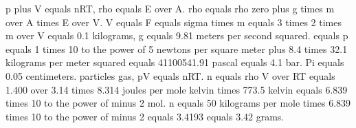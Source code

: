 p plus V equals nRT, rho equals E over A.  
rho equals rho zero plus g times m over A times E over V.  
V equals F equals sigma times m equals 3 times 2 times m over V equals 0.1 kilograms, g equals 9.81 meters per second squared.  
equals p equals 1 times 10 to the power of 5 newtons per square meter plus 8.4 times 32.1 kilograms per meter squared equals 41100541.91 pascal equals 4.1 bar.  
Pi equals 0.05 centimeters.  
particles gas, pV equals nRT.  
n equals rho V over RT equals 1.400 over 3.14 times 8.314 joules per mole kelvin times 773.5 kelvin equals 6.839 times 10 to the power of minus 2 mol.  
n equals 50 kilograms per mole times 6.839 times 10 to the power of minus 2 equals 3.4193 equals 3.42 grams.